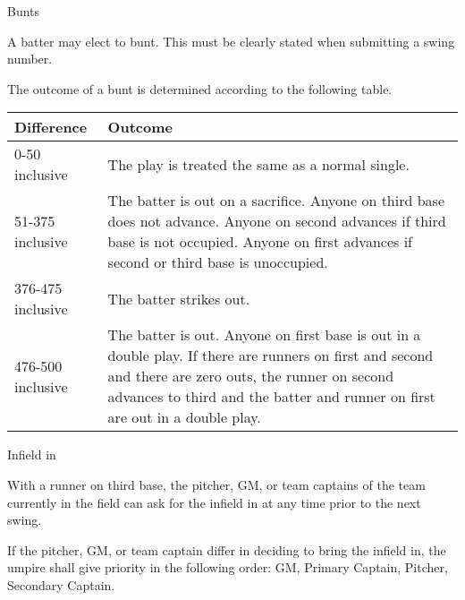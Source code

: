 \begin{deepEnumerate}
\begin{deepEnumerate}
\begin{center}
		\end{center}
	\end{deepEnumerate}
	\item Bunts
	\begin{deepEnumerate}
		\item A batter may elect to bunt. This must be clearly stated when submitting a swing number.
		\item The outcome of a bunt is determined according to the following table.        
		\begin{center}
			\begin{tabular}{|p{3cm}|p{8cm}|}
				\hline
				\textbf{Difference} & \textbf{Outcome}                                 \\
				\hline 
				0-50 inclusive                 & The play is treated the same as a normal single. \\
				\hline 
				51-375 inclusive               & The batter is out on a sacrifice.                
				Anyone on third base does not advance.
				Anyone on second advances if third base is not occupied.
				Anyone on first advances if second or third base is unoccupied. \\
				\hline 
				376-475 inclusive              & The batter strikes out.                          \\
				\hline
				476-500 inclusive              & The batter is out.                               
				Anyone on first base is out in a double play.
				If there are runners on first and second and there are zero outs,
				the runner on second advances to third and the batter and runner on first are out in a double play. \\
				\hline
			\end{tabular}
		\end{center}
    \end{deepEnumerate}
    \item Infield in
    \begin{deepEnumerate}
        \item With a runner on third base, the pitcher, GM, or team captains of the team currently in the field 
		can ask for the infield in at any time prior to the next swing.
		\begin{deepEnumerate}
			\item If the pitcher, GM, or team captain differ in deciding to bring the infield in, 
        	the umpire shall give priority in the following order: GM, Primary Captain, Pitcher, Secondary Captain.
			\begin{deepEnumerate}

\end{deepEnumerate}
\end{deepEnumerate}
\end{deepEnumerate}
\end{deepEnumerate}
